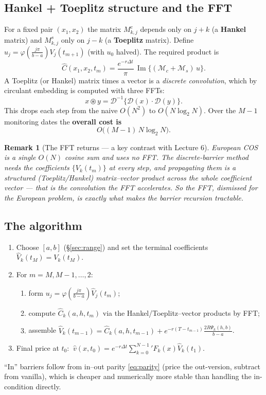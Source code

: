 \documentclass[11pt]{article}
\newcommand{\Imag}{\operatorname{Im}}
\newcommand{\ch}{\varphi}
\newtheorem{remark}{Remark}
\begin{document}
\subsection{Hankel + Toeplitz structure and the FFT}\label{sec:fft}
For a fixed pair $(x_1,x_2)$ the matrix $M^c_{k,j}$ depends only on $j+k$ (a \textbf{Hankel} matrix) and
$M^s_{k,j}$ only on $j-k$ (a \textbf{Toeplitz} matrix). Define $u_j=\ch(\tfrac{j\pi}{b-a})V_j(t_{m+1})$
(with $u_0$ halved). The required product is
\begin{equation}
\hat C(x_1,x_2,t_m)=\frac{e^{-r\Delta t}}{\pi}\,\Imag\big\{(\mathcal M_c+\mathcal M_s)\,u\big\}.
\end{equation}
A Toeplitz (or Hankel) matrix times a vector is a \emph{discrete convolution}, which by circulant embedding
is computed with three FFTs:
\begin{equation}
x\circledast y=\mathcal D^{-1}\{\mathcal D(x)\cdot\mathcal D(y)\}.
\end{equation}
This drops each step from the naive $O(N^2)$ to $O(N\log_2 N)$. Over the $M-1$ monitoring dates the
\textbf{overall cost is}
\begin{equation}
\boxed{\;O\big((M-1)\,N\log_2 N\big).\;}
\end{equation}

\begin{remark}[The FFT returns --- a key contrast with Lecture 6]
European COS is a single $O(N)$ cosine sum and uses \emph{no} FFT. The discrete-barrier method needs the
coefficients $\{V_k(t_m)\}$ at \emph{every} step, and propagating them is a structured (Toeplitz/Hankel)
matrix--vector product across the whole coefficient vector --- that is the convolution the FFT accelerates. So
the FFT, dismissed for the European problem, is exactly what makes the barrier recursion tractable.
\end{remark}

\subsection{The algorithm}
\begin{enumerate}[leftmargin=*]
  \item Choose $[a,b]$ (\S\ref{sec:range}) and set the terminal coefficients $\hat V_k(t_M)=V_k(t_M)$.
  \item For $m=M,M-1,\dots,2$:
  \begin{enumerate}[label=(\alph*)]
    \item form $u_j=\ch(\tfrac{j\pi}{b-a})\hat V_j(t_m)$;
    \item compute $\hat C_k(a,h,t_m)$ via the Hankel/Toeplitz--vector products by FFT;
    \item assemble $\hat V_k(t_{m-1})=\hat C_k(a,h,t_{m-1})+e^{-r(T-t_{m-1})}\tfrac{2R\Psi_k(h,b)}{b-a}$.
  \end{enumerate}
  \item Final price at $t_0$: $\ \hat v(x,t_0)=e^{-r\Delta t}\sum_{k=0}^{N-1}{}'F_k(x)\hat V_k(t_1)$.
\end{enumerate}
``In'' barriers follow from in--out parity \eqref{eq:parity} (price the out-version, subtract from vanilla),
which is cheaper and numerically more stable than handling the in-condition directly.
\end{document}
